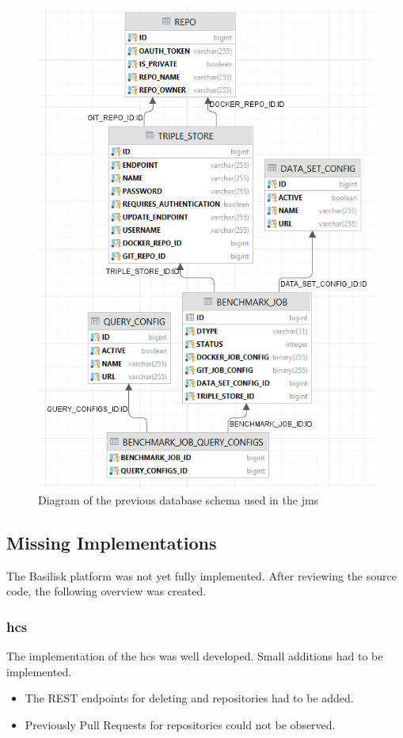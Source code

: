 \begin{figure}[tbph]
	\centering
	\includegraphics[width=.7\textwidth]{figures/jms_db_schema.png}
	\caption{Diagram of the previous database schema used in the \ac{jms}}
	\label{fig:jms_db_schema}
\end{figure}



\subsection{Missing Implementations}
\label{sec:review_missing_impl}
The Basilisk platform was not yet fully implemented.
After reviewing the source code, the following overview was created.

\subsubsection{\acl{hcs}}
The implementation of the \acl{hcs} was well developed.
Small additions had to be implemented.

\begin{itemize}
	\item The REST endpoints for deleting \gh{} and \dockh{} repositories had to be added.
	
	\item Previously Pull Requests for \gh{} repositories could not be observed.
\end{itemize}


